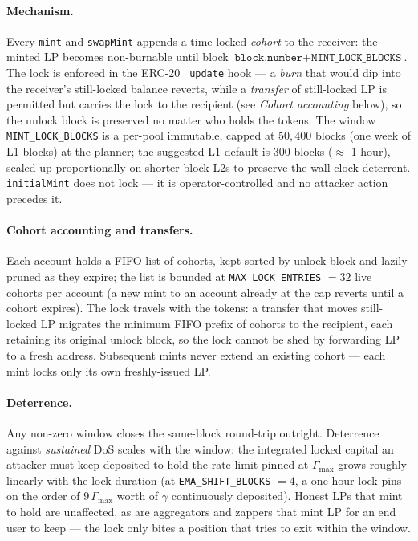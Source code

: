 \documentclass[11pt]{article}
\begin{document}
\paragraph{Mechanism.} Every \texttt{mint} and \texttt{swapMint}
appends a time-locked \emph{cohort} to the receiver: the minted LP
becomes non-burnable until block
$\texttt{block.number} + \texttt{MINT\_LOCK\_BLOCKS}$. The lock is
enforced in the ERC-20 \texttt{\_update} hook --- a \emph{burn} that
would dip into the receiver's still-locked balance reverts, while a
\emph{transfer} of still-locked LP is permitted but carries the lock to
the recipient (see \emph{Cohort accounting} below), so the unlock block
is preserved no matter who holds the tokens. The
window \texttt{MINT\_LOCK\_BLOCKS} is a per-pool immutable, capped at
$50{,}400$ blocks (one week of L1 blocks) at the planner; the suggested
L1 default is $300$ blocks ($\approx$ 1 hour), scaled up proportionally
on shorter-block L2s to preserve the wall-clock deterrent.
\texttt{initialMint} does not lock --- it is operator-controlled and no
attacker action precedes it.

\paragraph{Cohort accounting and transfers.} Each account holds a
FIFO list of cohorts, kept sorted by unlock block and lazily pruned as
they expire; the list is bounded at \texttt{MAX\_LOCK\_ENTRIES} $= 32$
live cohorts per account (a new mint to an account already at the cap
reverts until a cohort expires). The lock travels with the tokens: a
transfer that moves still-locked LP migrates the minimum FIFO prefix of
cohorts to the recipient, each retaining its original unlock block, so
the lock cannot be shed by forwarding LP to a fresh address. Subsequent
mints never extend an existing cohort --- each mint locks only its own
freshly-issued LP.

\paragraph{Deterrence.} Any non-zero window closes the same-block
round-trip outright. Deterrence against \emph{sustained} DoS scales
with the window: the integrated locked capital an attacker must keep
deposited to hold the rate limit pinned at $\Gamma_{\max}$ grows
roughly linearly with the lock duration (at \texttt{EMA\_SHIFT\_BLOCKS}
$=4$, a one-hour lock pins on the order of $9\,\Gamma_{\max}$ worth of
$\gamma$ continuously deposited). Honest LPs that mint to hold are
unaffected, as are aggregators and zappers that mint LP for an end user
to keep --- the lock only bites a position that tries to exit within
the window.
\end{document}

